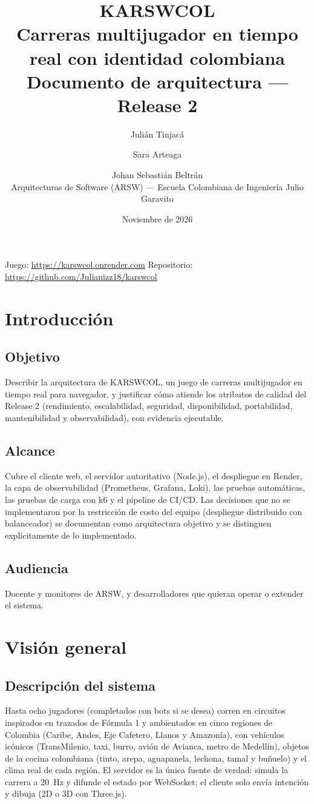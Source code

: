 \documentclass[11pt,a4paper]{article}
\title{\textbf{KARSWCOL}\\[4pt]\large Carreras multijugador en tiempo real con identidad colombiana\\[2pt]\normalsize Documento de arquitectura --- Release 2}
\author{Julián Tinjacá \and Sara Arteaga \and Johan Sebastián Beltrán\\[4pt]
\small Arquitecturas de Software (ARSW) --- Escuela Colombiana de Ingeniería Julio Garavito}
\date{Noviembre de 2026}
\begin{document}
\maketitle
\begin{center}
\small Juego: \url{https://karswcol.onrender.com} \quad
Repositorio: \url{https://github.com/Julianizz18/karswcol}
\end{center}
\tableofcontents
\newpage

\section{Introducción}
\subsection{Objetivo}
Describir la arquitectura de KARSWCOL, un juego de carreras multijugador en
tiempo real para navegador, y justificar cómo atiende los atributos de
calidad del Release 2 (rendimiento, escalabilidad, seguridad, disponibilidad,
portabilidad, mantenibilidad y observabilidad), con evidencia ejecutable.

\subsection{Alcance}
Cubre el cliente web, el servidor autoritativo (Node.js), el despliegue en
Render, la capa de observabilidad (Prometheus, Grafana, Loki), las pruebas
automáticas, las pruebas de carga con k6 y el pipeline de CI/CD. Las
decisiones que no se implementaron por la restricción de costo del equipo
(despliegue distribuido con balanceador) se documentan como arquitectura
objetivo y se distinguen explícitamente de lo implementado.

\subsection{Audiencia}
Docente y monitores de ARSW, y desarrolladores que quieran operar o
extender el sistema.

\section{Visión general}
\subsection{Descripción del sistema}
Hasta ocho jugadores (completados con bots si se desea) corren en circuitos
inspirados en trazados de Fórmula 1 y ambientados en cinco regiones de
Colombia (Caribe, Andes, Eje Cafetero, Llanos y Amazonía), con vehículos
icónicos (TransMilenio, taxi, burro, avión de Avianca, metro de Medellín),
objetos de la cocina colombiana (tinto, arepa, aguapanela, lechona, tamal y
buñuelo) y el clima real de cada región. El servidor es la única fuente de
verdad: simula la carrera a 20~Hz y difunde el estado por WebSocket; el
cliente solo envía intención y dibuja (2D o 3D con Three.js).
\end{document}
